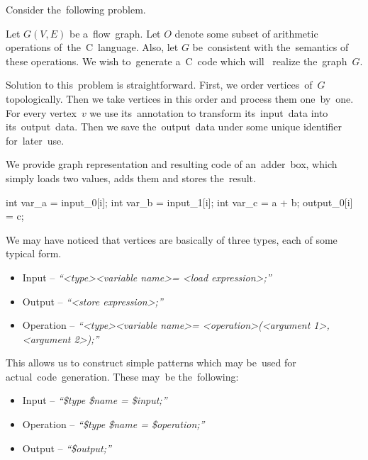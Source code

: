 Consider the~following problem.

\begin{problem}
Let $G(V,E)$ be a~flow~graph. Let $O$ denote some subset of arithmetic operations of~the~C~language. Also, let $G$ be~consistent with the~semantics of these operations. We wish to~generate a~C~code which will~ realize the~graph~$G$.
\end{problem}

\FloatBarrier

Solution to this~problem is straightforward. First, we order vertices~of~$G$ topologically. Then we take vertices in this order and process them one~by~one. For every vertex~$v$ we use its~annotation to transform its~input~data into its~output~data. Then we save the~output~data under some unique identifier for~later~use.

\parspace

We provide graph representation and resulting code of an~adder~box, which simply loads two values, adds them and stores the~result.


\begin{code}
int var_a = input_0[i];
int var_b = input_1[i];
int var_c = a + b;
output_0[i] = c;
\end{code}

\FloatBarrier

We may have noticed that vertices are basically of three types, each of some typical form. 

\begin{itemize}
  \item Input -- \emph{``\textless type\textgreater  \textless variable name\textgreater  = \textless load expression\textgreater ;''}
  \item Output -- \emph{``\textless store expression\textgreater ;''}
  \item Operation -- \emph{``\textless type\textgreater  \textless variable name\textgreater  = \textless operation\textgreater (\textless argument 1\textgreater , \textless argument 2\textgreater );''}
\end{itemize}

This allows us to construct simple patterns which may be~used for actual~code~generation. These may~be the~following:

\begin{itemize}
  \item Input -- \emph{``\$type \$name = \$input;''}
  \item Operation -- \emph{``\$type \$name = \$operation;''}
  \item Output -- \emph{``\$output;''}
\end{itemize}


